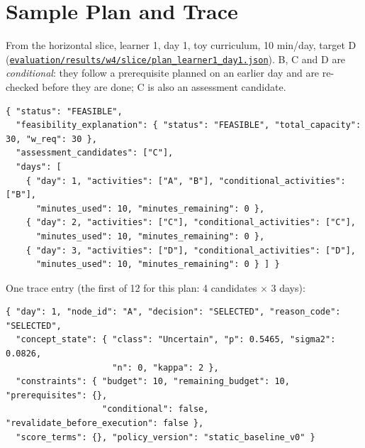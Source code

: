 \documentclass[english]{sintr}
\newcommand{\repourl}{https://github.com/Bhuvan-56/adaptive-learning-path-planner-DAT}
\newcommand{\sha}{cs5903-final-2026}
\DeclareRobustCommand{\rf}[1]{\href{\repourl/blob/\sha/#1}{\nolinkurl{#1}}}
\begin{document}
\section{Sample Plan and Trace}
\label{app:sample}
From the horizontal slice, learner 1, day 1, toy curriculum, 10 min/day, target D (\rf{evaluation/results/w4/slice/plan_learner1_day1.json}). B, C and D are \textit{conditional}: they follow a prerequisite planned on an earlier day and are re-checked before they are done; C is also an assessment candidate.
{\footnotesize
\begin{verbatim}
{ "status": "FEASIBLE",
  "feasibility_explanation": { "status": "FEASIBLE", "total_capacity": 30, "w_req": 30 },
  "assessment_candidates": ["C"],
  "days": [
    { "day": 1, "activities": ["A", "B"], "conditional_activities": ["B"],
      "minutes_used": 10, "minutes_remaining": 0 },
    { "day": 2, "activities": ["C"], "conditional_activities": ["C"],
      "minutes_used": 10, "minutes_remaining": 0 },
    { "day": 3, "activities": ["D"], "conditional_activities": ["D"],
      "minutes_used": 10, "minutes_remaining": 0 } ] }
\end{verbatim}
}
One trace entry (the first of 12 for this plan: 4 candidates $\times$ 3 days):
{\footnotesize
\begin{verbatim}
{ "day": 1, "node_id": "A", "decision": "SELECTED", "reason_code": "SELECTED",
  "concept_state": { "class": "Uncertain", "p": 0.5465, "sigma2": 0.0826,
                     "n": 0, "kappa": 2 },
  "constraints": { "budget": 10, "remaining_budget": 10, "prerequisites": {},
                   "conditional": false, "revalidate_before_execution": false },
  "score_terms": {}, "policy_version": "static_baseline_v0" }
\end{verbatim}
}
\end{document}
